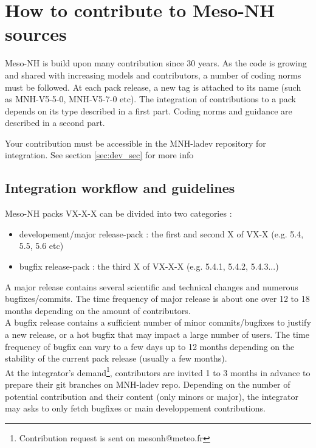 \section{How to contribute to Meso-NH sources}
\label{sec:contribute}
Meso-NH is build upon many contribution since 30 years. As the code is growing and shared with increasing models and contributors, a number of coding norms must be followed. At each pack release, a new tag is attached to its name (such as MNH-V5-5-0, MNH-V5-7-0 etc). The integration of contributions to a pack depends on its type described in a first part. Coding norms and guidance are described in a second part.
\begin{importantblock}
Your contribution must be accessible in the MNH-ladev repository for integration.
See section \ref{sec:dev_sec} for more info
\end{importantblock}
\subsection{Integration workflow and guidelines}
Meso-NH packs VX-X-X can be divided into two categories :
\begin{itemize}
    \item developement/major release-pack : the first and second X of VX-X (e.g. 5.4, 5.5, 5.6 etc)
    \item bugfix release-pack : the third X of VX-X-X (e.g. 5.4.1, 5.4.2, 5.4.3...)
\end{itemize}
A major release contains several scientific and technical changes and numerous bugfixes/commits. The time frequency of major release is about one over 12 to 18 months depending on the amount of contributors. \\
A bugfix release contains a sufficient number of minor commits/bugfixes to justify a new release, or a hot bugfix that may impact a large number of users. The time frequency of bugfix can vary to a few days up to 12 months depending on the stability of the current pack release (usually a few months). \\

At the integrator's demand\footnote{Contribution request is sent on mesonh@meteo.fr}, contributors are invited 1 to 3 months in advance to prepare their git branches on MNH-ladev repo. Depending on the number of potential contribution and their content (only minors or major), the integrator may asks to only fetch bugfixes or main developpement contributions. \\

